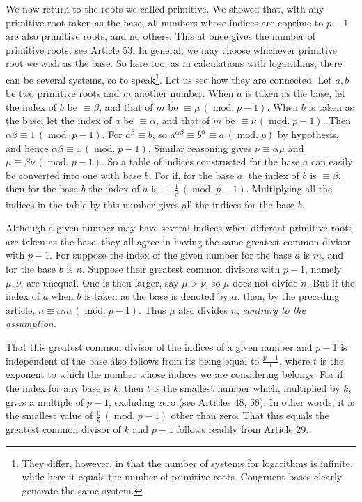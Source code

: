 We now return to the roots we called primitive. We showed that, with any primitive root taken as the base, all numbers whose indices are coprime to $p-1$ are also primitive roots, and no others. This at once gives the number of primitive roots; see Article 53. In general, we may choose whichever primitive root we wish as the base. So here too, as in calculations with logarithms, there can be several systems, so to speak\begingroup\renewcommand{\thefootnote}{*)}\footnote{They differ, however, in that the number of systems for logarithms is infinite, while here it equals the number of primitive roots. Congruent bases clearly generate the same system.}\endgroup.
Let us see how they are connected. Let $a,b$ be two primitive roots and $m$ another number. When $a$ is taken as the base, let the index of $b$ be $\equiv\beta$, and that of $m$ be $\equiv\mu\,(\operatorname{mod.}p-1)$. When $b$ is taken as the base, let the index of $a$ be $\equiv\alpha$, and that of $m$ be $\equiv\nu\,(\operatorname{mod.}p-1)$. Then $\alpha\beta\equiv1\,(\operatorname{mod.}p-1)$. For $a^\beta\equiv b$, so $a^{\alpha\beta}\equiv b^\alpha\equiv a\,(\operatorname{mod.}p)$ by hypothesis, and hence $\alpha\beta\equiv1\,(\operatorname{mod.}p-1)$. Similar reasoning gives $\nu\equiv\alpha\mu$ and $\mu\equiv\beta\nu\,(\operatorname{mod.}p-1)$. So a table of indices constructed for the base $a$ can easily be converted into one with base $b$. For if, for the base $a$, the index of $b$ is $\equiv\beta$, then for the base $b$ the index of $a$ is $\equiv\frac{1}{\beta}\,(\operatorname{mod.}p-1)$. Multiplying all the indices in the table by this number gives all the indices for the base $b$.

Although a given number may have several indices when different primitive roots are taken as the base, they all agree in having the same greatest common divisor with $p-1$. For suppose the index of the given number for the base $a$ is $m$, and for the base $b$ is $n$. Suppose their greatest common divisors with $p-1$, namely $\mu,\nu$, are unequal. One is then larger, say $\mu>\nu$, so $\mu$ does not divide $n$. But if the index of $a$ when $b$ is taken as the base is denoted by $\alpha$, then, by the preceding article, $n\equiv\alpha m\,(\operatorname{mod.}p-1)$. Thus $\mu$ also divides $n$, \emph{contrary to the assumption.}

That this greatest common divisor of the indices of a given number and $p-1$ is independent of the base also follows from its being equal to $\frac{p-1}{t}$, where $t$ is the exponent to which the number whose indices we are considering belongs. For if the index for any base is $k$, then $t$ is the smallest number which, multiplied by $k$, gives a multiple of $p-1$, excluding zero (see Articles 48, 58). In other words, it is the smallest value of $\frac{0}{k}\,(\operatorname{mod.}p-1)$ other than zero. That this equals the greatest common divisor of $k$ and $p-1$ follows readily from Article 29.

